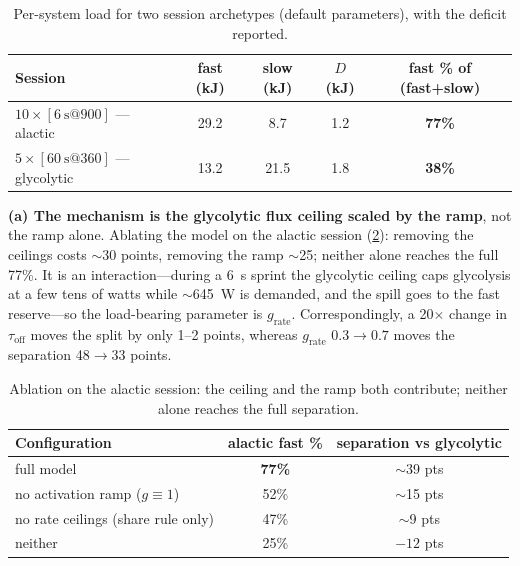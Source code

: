 \documentclass[11pt,a4paper]{article}
\newcommand{\grate}{\ensuremath{g_{\mathrm{rate}}}}
\newcommand{\tauoff}{\ensuremath{\tau_{\mathrm{off}}}}
\begin{document}
\begin{table}[htbp]\centering\small
\caption{Per-system load for two session archetypes (default parameters), with the deficit reported.}
\label{tab:partition}
\renewcommand{\arraystretch}{1.2}
\begin{tabular}{@{}lcccc@{}}
\toprule
\textbf{Session} & \textbf{fast (kJ)} & \textbf{slow (kJ)} & \textbf{$D$ (kJ)} & \textbf{fast \% of (fast+slow)} \\
\midrule
$10\times[\SI{6}{\second}@900]$ --- alactic     & 29.2 & 8.7  & 1.2 & \textbf{77\%} \\
$5\times[\SI{60}{\second}@360]$ --- glycolytic   & 13.2 & 21.5 & 1.8 & \textbf{38\%} \\
\bottomrule
\end{tabular}
\end{table}

\textbf{(a) The mechanism is the glycolytic flux ceiling scaled by the ramp}, not the ramp alone. Ablating
the model on the alactic session (\cref{tab:ablation}): removing the ceilings costs $\sim$30 points,
removing the ramp $\sim$25; neither alone reaches the full 77\%. It is an interaction---during a 6~s sprint
the glycolytic ceiling caps glycolysis at a few tens of watts while $\sim$645~W is demanded, and the spill
goes to the fast reserve---so the load-bearing parameter is \grate. Correspondingly, a 20$\times$ change in
\tauoff{} moves the split by only 1--2 points, whereas \grate{} $0.3\rightarrow0.7$ moves the separation
48$\rightarrow$33 points.

\begin{table}[htbp]\centering\small
\caption{Ablation on the alactic session: the ceiling and the ramp both contribute; neither alone reaches
the full separation.}
\label{tab:ablation}
\renewcommand{\arraystretch}{1.2}
\begin{tabular}{@{}lcc@{}}
\toprule
\textbf{Configuration} & \textbf{alactic fast \%} & \textbf{separation vs glycolytic} \\
\midrule
full model                     & \textbf{77\%} & $\sim$39 pts \\
no activation ramp ($g\equiv1$) & 52\%          & $\sim$15 pts \\
no rate ceilings (share rule only) & 47\%       & $\sim$9 pts \\
neither                        & 25\%          & $-12$ pts \\
\bottomrule
\end{tabular}
\end{table}
\end{document}
